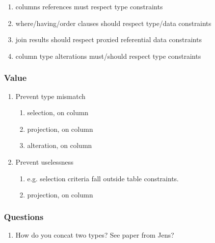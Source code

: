\documentclass[12pt]{article}
\begin{document}
\begin{enumerate}
  \item columns references must respect type constraints
  \item where/having/order clauses should respect type/data constraints
  \item join results should respect proxied referential data constraints
  \item column type alterations must/should respect type constraints
\end{enumerate}

\subsubsection{Value}
\begin{enumerate}
  \item Prevent type mismatch
    \begin{enumerate}
      \item selection,  on  column
      \item projection,  on  column
      \item alteration,  on  column
    \end{enumerate}
  \item Prevent uselessness
    \begin{enumerate}
      \item e.g. selection criteria fall outside table constraints.
      \item projection,  on  column
    \end{enumerate}
\end{enumerate}

\subsubsection{Questions}
\begin{enumerate}
  \item How do you concat two types? See paper from Jens?
\end{enumerate}

\newpage



\end{document}
